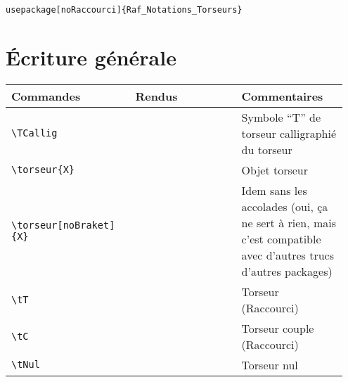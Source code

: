 \documentclass[a4paper,10pt]{article}
\newcommand{\rac}{({\color{red}Raccourci})}
\begin{document}
	\begin{verbatim}
usepackage[noRaccourci]{Raf_Notations_Torseurs}
	\end{verbatim}

	\section{Écriture générale}
	\noindent
	\begin{tabular}{|p{0.35\linewidth}|p{0.3\linewidth}|p{0.3\linewidth}|}
		\hline
			\textbf{Commandes}&\textbf{Rendus}&\textbf{Commentaires}
		\\\hline\hline
			\verb!\TCallig!			&	\TCallig		&	Symbole ``T'' de torseur calligraphié du torseur
		\\\hline
			\verb!\torseur{X}!		&	\torseur{X}		&	Objet torseur
		\\\hline
			\verb!\torseur[noBraket]{X}!		&	\torseur[noBraket]{X}		&	Idem sans les accolades (oui, ça ne sert à rien, mais c'est compatible avec d'autres trucs d'autres packages)
		\\\hline
			\verb!\tT!			&	\tT			&	Torseur \TCallig \rac
		\\\hline
			\verb!\tC!			&	\tC			&	Torseur couple \rac
		\\\hline
			\verb!\tNul!			&	\tNul			&	Torseur nul
		\\\hline
	\end{tabular}
\end{document}
